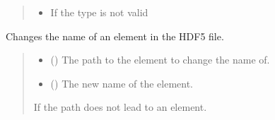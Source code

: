 \documentclass[letterpaper,10pt,english]{sphinxmanual}
\begin{document}
\begin{fulllineitems}
\begin{fulllineitems}
\begin{quote}
\begin{description}
\begin{itemize}
\item {} 
\sphinxAtStartPar
{\hyperref[\detokenize{source/HDF5_BLS:HDF5_BLS.WrapperError.WrapperError_ArgumentType}]{}} \textendash{} If the type is not valid

\end{itemize}

\end{description}\end{quote}

\end{fulllineitems}


\begin{fulllineitems}
\label{\detokenize{source/HDF5_BLS:HDF5_BLS.wrapper.Wrapper.change_name}}
\pysigstartsignatures
\pysiglinewithargsret
{}
{\sphinxparamcomma {}}
{}
\pysigstopsignatures
\sphinxAtStartPar
Changes the name of an element in the HDF5 file.
\begin{quote}\begin{description}
\begin{itemize}
\item {} 
\sphinxAtStartPar
{} () \textendash{} The path to the element to change the name of.

\item {} 
\sphinxAtStartPar
{} () \textendash{} The new name of the element.

\end{itemize}

\sphinxAtStartPar
{\hyperref[\detokenize{source/HDF5_BLS:HDF5_BLS.WrapperError.WrapperError_StructureError}]{}} \textendash{} If the path does not lead to an element.

\end{description}\end{quote}

\end{fulllineitems}


\end{fulllineitems}
\end{document}
